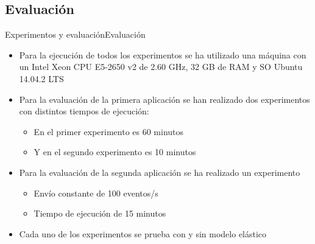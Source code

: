 \subsection*{Evaluación}
\begin{frame}{Experimentos y evaluación}{Evaluación}
\begin{itemize}
\item Para la ejecución de todos los experimentos se ha utilizado una máquina con un Intel Xeon CPU E5-2650 v2 de 2.60 GHz, 32 GB de RAM y SO Ubuntu 14.04.2 LTS

\item Para la evaluación de la primera aplicación se han realizado dos experimentos con distintos tiempos de ejecución:
\begin{itemize}
\item En el primer experimento es 60 minutos
\item Y en el segundo experimento es 10 minutos
\end{itemize}

\item Para la evaluación de la segunda aplicación se ha realizado un experimento
\begin{itemize}
	\item Envío constante de 100 eventos/s
	\item Tiempo de ejecución de 15 minutos
\end{itemize}

\item Cada uno de los experimentos se prueba con y sin modelo elástico

\end{itemize}
\end{frame}



